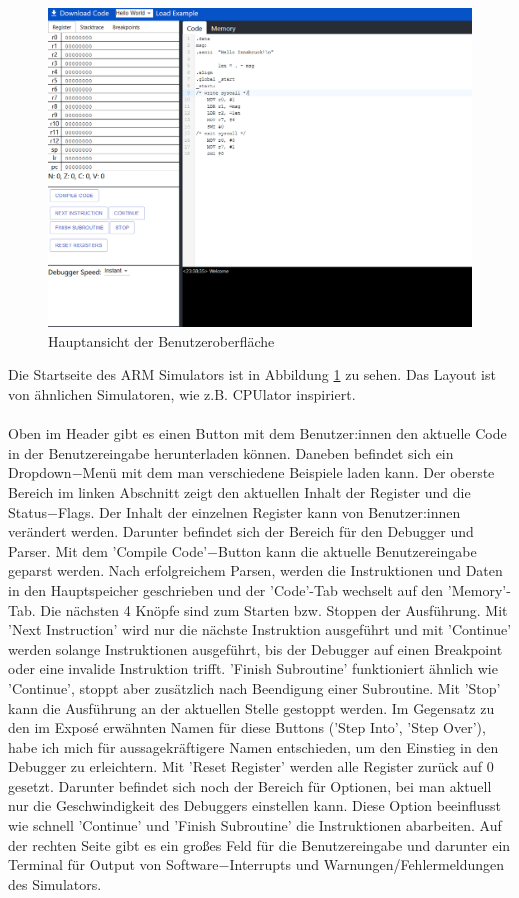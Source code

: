 \documentclass[a4paper, 11pt, onecolumn]{article}
\begin{document}
\begin{figure}[!htb]
\centering
\includegraphics[width=1\textwidth]{data/ui}
\caption{Hauptansicht der Benutzeroberfläche}
\label{fig:ui}
\end{figure}

Die Startseite des ARM Simulators ist in Abbildung \ref{fig:ui} zu sehen. Das Layout ist von ähnlichen Simulatoren, wie z.B. CPUlator \cite{cpulator} inspiriert.\\ \\
Oben im Header gibt es einen Button mit dem Benutzer:innen den aktuelle Code in der Benutzereingabe herunterladen können. Daneben befindet sich ein Dropdown$-$Menü mit dem man verschiedene Beispiele laden kann.
Der oberste Bereich im linken Abschnitt zeigt den aktuellen Inhalt der Register und die Status$-$Flags. Der Inhalt der einzelnen Register kann von Benutzer:innen verändert werden. Darunter befindet sich der Bereich für den Debugger und Parser. Mit dem 'Compile Code'$-$Button kann die aktuelle Benutzereingabe geparst werden. Nach erfolgreichem Parsen, werden die Instruktionen und Daten in den Hauptspeicher geschrieben und der 'Code'-Tab wechselt auf den 'Memory'-Tab. Die nächsten 4 Knöpfe sind zum Starten bzw. Stoppen der Ausführung. Mit 'Next Instruction' wird nur die nächste Instruktion ausgeführt und mit 'Continue' werden solange Instruktionen ausgeführt, bis der Debugger auf einen Breakpoint oder eine invalide Instruktion trifft. 'Finish Subroutine' funktioniert ähnlich wie 'Continue', stoppt aber zusätzlich nach Beendigung einer Subroutine. Mit 'Stop' kann die Ausführung an der aktuellen Stelle gestoppt werden. Im Gegensatz zu den im Exposé erwähnten Namen für diese Buttons ('Step Into', 'Step Over'), habe ich mich für aussagekräftigere Namen entschieden, um den Einstieg in den Debugger zu erleichtern. Mit 'Reset Register' werden alle Register zurück auf 0 gesetzt. Darunter befindet sich noch der Bereich für Optionen, bei man aktuell nur die Geschwindigkeit des Debuggers einstellen kann. Diese Option beeinflusst wie schnell 'Continue' und 'Finish Subroutine' die Instruktionen abarbeiten. Auf der rechten Seite gibt es ein großes Feld für die Benutzereingabe und darunter ein Terminal für Output von Software$-$Interrupts und Warnungen/Fehlermeldungen des Simulators.
\end{document}
